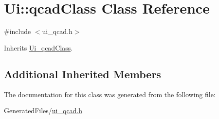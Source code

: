 \hypertarget{class_ui_1_1qcad_class}{\section{Ui\-:\-:qcad\-Class Class Reference}
\label{class_ui_1_1qcad_class}
}


{\ttfamily \#include $<$ui\-\_\-qcad.\-h$>$}



Inherits \hyperlink{class_ui__qcad_class}{Ui\-\_\-qcad\-Class}.

\subsection*{Additional Inherited Members}


The documentation for this class was generated from the following file\-:\begin{DoxyCompactItemize}
\item 
Generated\-Files/\hyperlink{ui__qcad_8h}{ui\-\_\-qcad.\-h}\end{DoxyCompactItemize}
